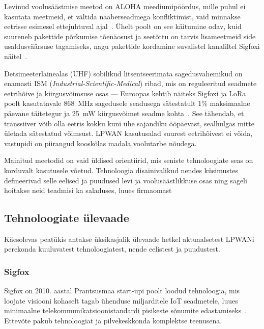 \documentclass[12pt]{article}
\begin{document}
    Levinud voolusäästmise meetod on ALOHA meediumipöördus, mille puhul ei kasutata meetmeid, et vältida naaberseadmega konfliktimist, vaid minnakse eetrisse esimesel ettejuhtuval ajal~\cite{raza}.
    Ühelt poolt on see käitumine odav, kuid suureneb pakettide põrkumise tõenäosust ja seetõttu on tarvis lisameetmeid side usaldusväärsuse tagamiseks, nagu pakettide kordamine suvalistel kanaliltel Sigfoxi näitel~\cite{raza}.

    Detsimeeterlainealas (UHF) sobilikud litsentseerimata sagedusvahemikud on enamasti ISM (\textit{Industrial-Scientific-Medical}) ribad, mis on reguleeritud seadmete eetrihõive ja kiirgusvõimsuse osas — Euroopas kehtib näiteks Sigfoxi ja LoRa poolt kasutatavale \SI{868}{\mega\hertz} sagedusele seadusega sätestatult 1\% maksimaalne päevane täitetegur ja \SI{25}{\milli\watt} kiirgusvõimet seadme kohta~\cite{etsi}.
    See tähendab, et transsiiver võib olla eetris kokku kuni ühe sajandiku ööpäevast, sealhulgas mitte ületada sätestatud võimsust.
    LPWAN kasutusalad suurest eetrihõivest ei võida, vastupidi on piirangud kooskõlas madala voolutarbe nõudega.

    Mainitud meetodid on vaid üldised orientiirid, mis seniste tehnoloogiate seas on korduvalt kasutusele võetud.
    Tehnoloogia disainivalikud nendes küsimustes defineerivad selle eelised ja puudused levi ja voolusäästlikkuse osas ning sageli hoitakse neid teadmisi ka saladuses, luues firmaomast

    \subsection{Tehnoloogiate ülevaade}

    Käesolevas peatükis antakse üksikasjalik ülevaade hetkel aktuaalsetest LPWANi perekonda kuuluvatest tehnoloogiatest, nende eelistest ja puudustest.

    \subsubsection{Sigfox}

    Sigfox on 2010. aastal Prantsusmaa start-upi poolt loodud tehnoloogia, mis loojate visiooni kohaselt tagab ühenduse miljarditele IoT seadmetele, luues minimaalne telekommunikatsioonistandardi pisikeste sõnumite edastamiseks~\cite{sigfox}.
    Ettevõte pakub tehnoloogiat ja pilvekeskkonda komplektse teenusena.
\end{document}

